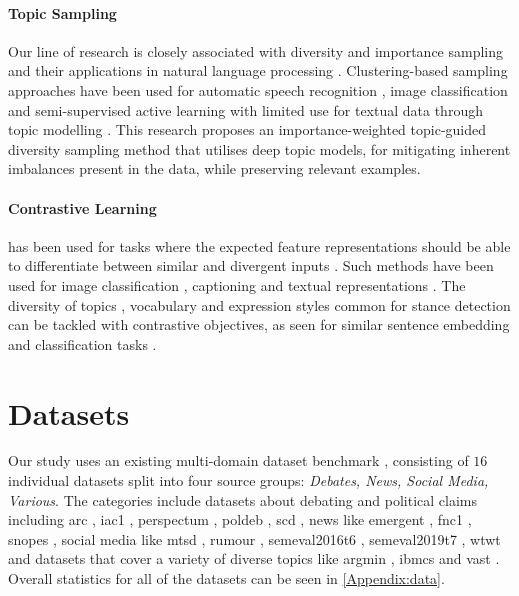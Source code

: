 \documentclass[11pt]{article}
\begin{document}
\paragraph{Topic Sampling}

Our line of research is closely associated with diversity \citep{ren2021survey} and importance \citep{beygelzimer2009importance} sampling and their applications in natural language processing \citep{zhu2008active,zhou2020informed}. Clustering-based sampling approaches have been used for  automatic speech recognition \citep{syed2016supervised}, image classification \citep{ranganathan2017deep,yan2022mitigating} and semi-supervised active learning \citep{buchert2022exploiting} with limited use for textual data \citep{yang2014active} through topic modelling \citep{blei2003latent}. This research proposes an importance-weighted topic-guided diversity sampling method that utilises deep topic models, for mitigating inherent imbalances present in the data, while preserving relevant examples. 


\paragraph{Contrastive Learning}  has been used for tasks where the expected feature representations should be able to differentiate between similar and divergent inputs \citep{liu2021self,10.1145/3561970}. Such methods have been used for image classification \citep{khosla2020supervised}, captioning \citep{dai2017contrastive} and textual representations \citep{giorgi2020declutr,jaiswal2020survey,ostendorff-etal-2022-neighborhood}. The diversity of topics \citep{qazvinian2011rumor,walker2012corpus,hasan2013stance}, vocabulary \citep{somasundaran2010recognizing,wei2019modeling} and expression styles \citep{pomerleau2017fake} common for stance detection can be tackled with contrastive objectives, as seen for similar sentence embedding and classification tasks \citep{gao2021simcse, yan2021consert}. 

\section{Datasets}
\label{sec:datasets}
Our study uses an existing multi-domain dataset benchmark \citep{hardalov2021cross}, consisting of $16$ individual datasets split into four source groups: \textit{Debates, News, Social Media, Various}. The categories include datasets about debating and political claims including arc \citep{hanselowski2018retrospective,habernal2017argument}, iac1 \citep{walker2012corpus}, perspectum \citep{chen2019seeing}, poldeb \citep{somasundaran2010recognizing}, scd \citep{hasan2013stance}, news like emergent \citep{ferreira2016emergent}, fnc1 \citep{pomerleau2017fake}, snopes \citep{hanselowski-etal-2019-richly}, social media like mtsd \cite{sobhani2017dataset}, rumour \citep{qazvinian2011rumor}, semeval2016t6 \citep{mohammad2016semeval}, semeval2019t7 \citep{gorrell2019semeval}, wtwt \citep{conforti2020will} and datasets that cover a variety of diverse topics like argmin \citep{stab-etal-2018-cross}, ibmcs \citep{bar-haim_stance_2017} and vast \citep{allaway-mckeown-2020-zero}. Overall statistics for all of the datasets can be seen in \autoref{Appendix:data}.
\end{document}
